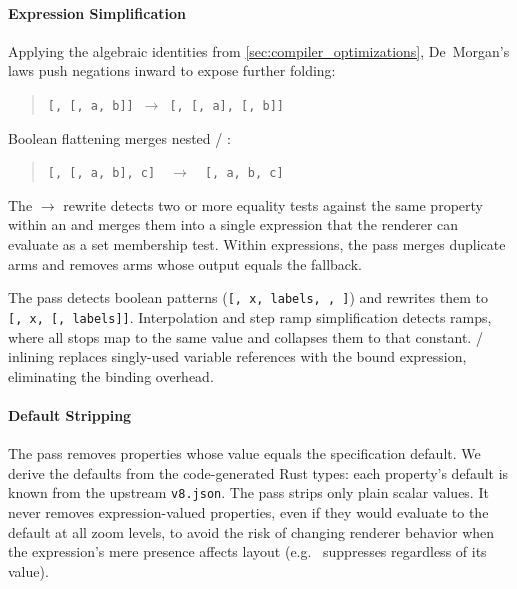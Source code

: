 \paragraph{Expression Simplification}
Applying the algebraic identities from \cref{sec:compiler_optimizations}, De~Morgan's laws push negations inward to expose further folding:
%
\begin{quote}
\texttt{[,~[,~a,~b]]}~$\to$~\texttt{[,~[,~a],~[,~b]]}
\end{quote}
%
\noindent Boolean flattening merges nested / :
%
\begin{quote}
\texttt{[,~[,~a,~b],~c]}~~$\to$~~\texttt{[,~a,~b,~c]}
\end{quote}
%
\noindent The $\to$ rewrite detects two or more equality tests against the same property within an  and merges them into a single  expression that the renderer can evaluate as a set membership test.
Within  expressions, the pass merges duplicate arms and removes arms whose output equals the fallback.

\begin{sloppypar}
The pass detects boolean  patterns (\texttt{[,\allowbreak~x,\allowbreak~labels,\allowbreak~,\allowbreak~]}) and rewrites them to \texttt{[,\allowbreak~x,\allowbreak~[,\allowbreak~labels]]}.
Interpolation and step ramp simplification detects ramps, where all stops map to the same value and collapses them to that constant.
/  inlining replaces singly-used variable references with the bound expression, eliminating the binding overhead.
\end{sloppypar}

\paragraph{Default Stripping}
The pass removes properties whose value equals the specification default.
We derive the defaults from the code-generated Rust types: each property's default is known from the upstream \texttt{v8.json}.
The pass strips only plain scalar values.
It never removes expression-valued properties, even if they would evaluate to the default at all zoom levels, to avoid the risk of changing renderer behavior when the expression's mere presence affects layout (e.g.\ \texttt{} suppresses \texttt{} regardless of its value).

